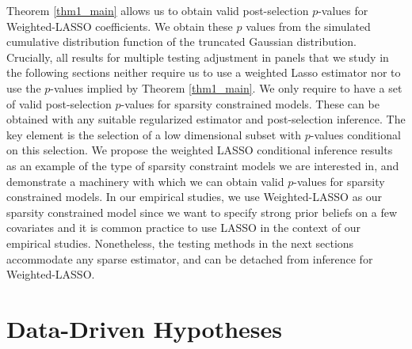 \documentclass[11pt]{article}
\begin{document}
	Theorem \ref{thm1_main} allows us to obtain valid post-selection $p$-values for Weighted-LASSO coefficients. We obtain these $p$ values from the simulated cumulative distribution function of the truncated Gaussian distribution. Crucially, all results for multiple testing adjustment in panels that we study in the following sections neither require us to use a weighted Lasso estimator nor to use the $p$-values implied by Theorem \ref{thm1_main}. We only require to have a set of valid post-selection $p$-values for sparsity constrained models. These can be obtained with any suitable regularized estimator and post-selection inference. The key element is the selection of a low dimensional subset with $p$-values conditional on this selection. We propose the weighted LASSO conditional inference results as an example of the type of sparsity constraint models we are interested in, and demonstrate a machinery with which we can obtain valid $p$-values for sparsity constrained models. In our empirical studies, we use Weighted-LASSO as our sparsity constrained model since we want to specify strong prior beliefs on a few covariates and it is common practice to use LASSO in the context of our empirical studies. Nonetheless, the testing methods in the next sections accommodate any sparse estimator, and can be detached from inference for Weighted-LASSO.      
	
	
	
	\section{Data-Driven Hypotheses}\label{sec_hypothesis}
	
\end{document}
